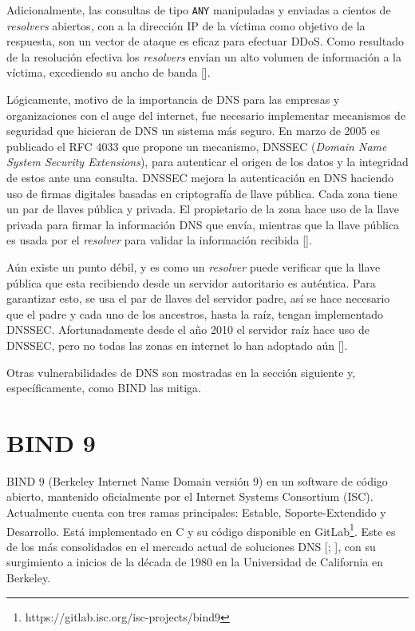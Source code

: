 Adicionalmente, las consultas de tipo \verb+ANY+ manipuladas y enviadas a cientos de \textit{resolvers} abiertos, con a la dirección IP de la víctima como objetivo de la respuesta, son un vector de ataque es eficaz para efectuar DDoS. Como resultado de la resolución efectiva los \textit{resolvers} envían un alto volumen de información a la víctima, excediendo su ancho de banda [\cite{dimitrov2020impacts}].

Lógicamente, motivo de la importancia de DNS para las empresas y organizaciones con el auge del internet, fue necesario implementar mecanismos de seguridad que hicieran de DNS un sistema más seguro. En marzo de 2005 es publicado el RFC 4033 que propone un mecanismo, DNSSEC (\textit{Domain Name System Security Extensions}), para autenticar el origen de los datos y la integridad de estos ante una consulta. DNSSEC mejora la autenticación en DNS haciendo uso de firmas digitales basadas en criptografía de llave pública. Cada zona tiene un par de llaves pública y privada. El propietario de la zona hace uso de la llave privada para firmar la información DNS que envía, mientras que la llave pública es usada por el \textit{resolver} para validar la información recibida [\cite{new-approach-dnssec}].

Aún existe un punto débil, y es como un \textit{resolver} puede verificar que la llave pública que esta recibiendo desde un servidor autoritario es auténtica. Para garantizar esto, se usa el par de llaves del servidor padre, así se hace necesario que el padre y cada uno de los ancestros, hasta la raíz, tengan implementado DNSSEC. Afortunadamente desde el año 2010 el servidor raíz hace uso de DNSSEC, pero no todas las zonas en internet lo han adoptado aún [\cite{dnssec-icann}].

Otras vulnerabilidades de DNS son mostradas en la sección siguiente y, específicamente, como BIND las mitiga.  

\section{BIND 9}

BIND 9 (Berkeley Internet Name Domain versión 9) en un software de código abierto, mantenido oficialmente por el Internet Systems Consortium (ISC). Actualmente cuenta con tres ramas principales: Estable, Soporte-Extendido y Desarrollo. Está implementado en C y su código disponible en GitLab\footnote{https://gitlab.isc.org/isc-projects/bind9}. Este es de los más consolidados en el mercado actual de soluciones DNS [\cite{dns-survey}; \cite{bind-usage}], con su surgimiento a inicios de la década de 1980 en la Universidad de California en Berkeley.

